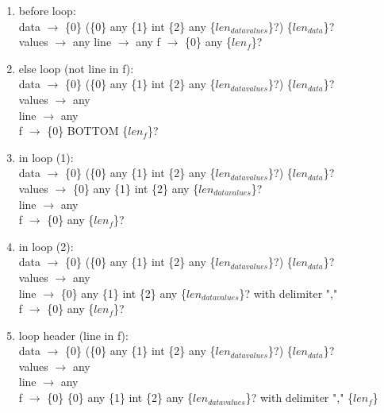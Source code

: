 \documentclass[11pt]{article}
\begin{document}
\begin{enumerate}
  \item before loop: \\
  data $\rightarrow$ \{0\} (\{0\} any \{1\} int \{2\} any \{$len_{datavalues}$\}?) \{$len_{data}$\}? \\
  values $\rightarrow$ any
  line $\rightarrow$ any
  f $\rightarrow$ \{0\} any \{$len_{f}$\}? \\
  
  \item else loop (not line in f): \\
  data $\rightarrow$ \{0\} (\{0\} any \{1\} int \{2\} any \{$len_{datavalues}$\}?) \{$len_{data}$\}? \\
  values $\rightarrow$ any \\
  line $\rightarrow$ any \\
  f $\rightarrow$ \{0\} BOTTOM \{$len_{f}$\}? \\
  
  \item in loop (1): \\
  data $\rightarrow$ \{0\} (\{0\} any \{1\} int \{2\} any \{$len_{datavalues}$\}?) \{$len_{data}$\}? \\
  values $\rightarrow$ \{0\} any \{1\} int \{2\} any \{$len_{datavalues}$\}? \\
  line $\rightarrow$ any \\
  f $\rightarrow$ \{0\} any \{$len_{f}$\}? \\
  
  \item in loop (2): \\
  data $\rightarrow$ \{0\} (\{0\} any \{1\} int \{2\} any \{$len_{datavalues}$\}?) \{$len_{data}$\}? \\
  values $\rightarrow$ any \\
  line $\rightarrow$ \{0\} any \{1\} int \{2\} any \{$len_{datavalues}$\}? with delimiter "," \\
  f $\rightarrow$ \{0\} any \{$len_{f}$\}? \\
  
  \item loop header (line in f): \\
  data $\rightarrow$ \{0\} (\{0\} any \{1\} int \{2\} any \{$len_{datavalues}$\}?) \{$len_{data}$\}? \\
  values $\rightarrow$ any \\
  line $\rightarrow$ any \\
  f $\rightarrow$ \{0\} \{0\} any \{1\} int \{2\} any \{$len_{datavalues}$\}? with delimiter "," \{$len_{f}$\} \\
  

\end{enumerate}
\end{document}
